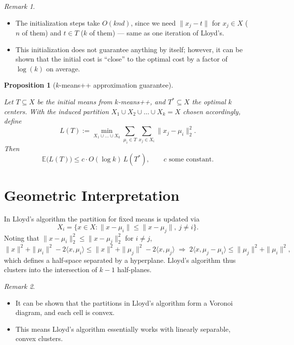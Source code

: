 \documentclass[
  letterpaper,
  DIV=11,
  numbers=noendperiod]{scrreprt}
\providecommand{\tightlist}{%
  \setlength{\itemsep}{0pt}\setlength{\parskip}{0pt}}
\theoremstyle{definition}
\theoremstyle{plain}
\theoremstyle{plain}
\newtheorem{proposition}{Proposition}[chapter]
\theoremstyle{definition}
\theoremstyle{plain}
\theoremstyle{plain}
\theoremstyle{remark}
\newtheorem*{remark}{Remark}
\begin{document}
\begin{remark}
\leavevmode

\begin{itemize}
\tightlist
\item
  The initialization steps take \(O(knd)\), since we need
  \(\|x_j - t\|\) for \(x_j \in X\) (\(n\) of them) and \(t \in T\)
  (\(k\) of them) --- same as one iteration of Lloyd's.
\item
  This initialization does not guarantee anything by itself; however, it
  can be shown that the initial cost is ``close'' to the optimal cost by
  a factor of \(\log(k)\) on average.
\end{itemize}

\end{remark}

\begin{proposition}[\(k\)-means++ approximation
guarantee]\protect\hypertarget{prp-kmeanspp-guarantee}{}\label{prp-kmeanspp-guarantee}

Let \(T \subseteq X\) be the initial means from \(k\)-means++, and
\(T^* \subseteq X\) the optimal \(k\) centers. With the induced
partition \(X_1 \cup X_2 \cup \dots \cup X_k = X\) chosen accordingly,
define \[
L(T) := \min_{X_1 \cup \dots \cup X_k} \sum_{\mu_i \in T} \sum_{x_j \in X_i} \|x_j - \mu_i\|_2^2 .
\] Then \[
\mathbb{E}\big(L(T)\big) \le c \cdot O(\log k)\, L(T^*), \qquad c \text{ some constant.}
\]

\end{proposition}

\section{Geometric Interpretation}\label{geometric-interpretation}

In Lloyd's algorithm the partition for fixed means is updated via \[
X_i = \big\{ x \in X : \|x - \mu_i\| \le \|x - \mu_j\|,\ j \ne i \big\}.
\] Noting that \(\|x - \mu_i\|_2^2 \le \|x - \mu_j\|_2^2\) for
\(i \ne j\), \[
\|x\|^2 + \|\mu_i\|^2 - 2\langle x, \mu_i\rangle \le \|x\|^2 + \|\mu_j\|^2 - 2\langle x, \mu_j\rangle
\;\Rightarrow\;
2\langle x, \mu_j - \mu_i\rangle \le \|\mu_j\|^2 + \|\mu_i\|^2 ,
\] which defines a half-space separated by a hyperplane. Lloyd's
algorithm thus clusters into the intersection of \(k-1\) half-planes.

\begin{remark}
\leavevmode

\begin{itemize}
\tightlist
\item
  It can be shown that the partitions in Lloyd's algorithm form a
  Voronoi diagram, and each cell is convex.
\item
  This means Lloyd's algorithm essentially works with linearly
  separable, convex clusters.
\end{itemize}

\end{remark}
\end{document}
